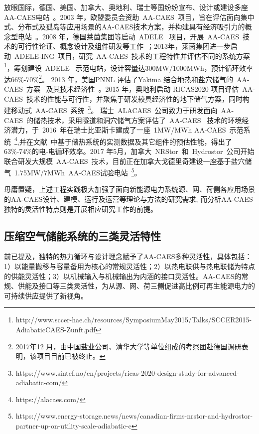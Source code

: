 放眼国际，德国、美国、加拿大、奥地利、瑞士等国纷纷宣布、设计或建设多座AA-CAES电站~\cite{CAES-Review-16-Polygeneration,CAES-Review-09,CAES-Review-16-Rui}。2003 年，欧盟委员会资助~AA-CAES~项目，旨在评估面向集中式、分布式及孤岛等应用场景的AA-CAES技术方案，并构建具有经济吸引力的概念型电站~\cite{AA-CAES-04}。2008 年，德国莱茵集团等启动~ADELE~ 项目，开展~AA-CAES~技术的可行性论证、概念设计及组件研发等工作~\cite{AA-CAES-07}；2013年，莱茵集团进一步启动~ADELE-ING~项目，研究~AA-CAES~技术的工程特性并评估不同的系统方案\footnote{http://www.sccer-hae.ch/resources/SymposiumMay2015/Talks/SCCER2015-AdiabaticCAES-Zunft.pdf}，筹划建设~ADELE~ 示范电站，设计容量达300MW/1000MWh，预计循环效率达66\%-70\%\footnote{2017年12 月，由中国盐业公司、清华大学等单位组成的考察团赴德国调研表明，该项目目前已被终止。}。 2013 年，美国PNNL 评估了Yakima 结合地热和盐穴储气的~AA-CAES~方案~\cite{AA-CAES-Patent-12} 及其技术经济性~\cite{CAES-PNNL-13}。2015 年，奥地利启动 RICAS2020 项目评估~AA-CAES~技术的性能与可行性，并聚焦于研发较具经济性的地下储气方案，同时构建移动式~AA-CAES~系统~\footnote{https://www.sintef.no/en/projects/ricas-2020-design-study-for-advanced-adiabatic-com/}。 瑞士~ALACAES~公司致力于研发面向~AA-CAES~的储热技术，采用隧道和洞穴储气方案评估了~AA-CAES~ 技术的环境经济潜力，于~2016~年在瑞士比亚斯卡建成了一座~1MW/MWh AA-CAES~示范系统~\footnote{https://alacaes.com/},并在文献~中基于储热系统的实测数据及其它组件的预估性能，得出了63\%-74\%的电-电循环效率。2017 年5月，加拿大~NRStor~和~Hydrostor~公司开始联合研发大规模~AA-CAES~技术，目前正在加拿大戈德里奇建设一座基于盐穴储气~1.75MW/7MWh~AA-CAES试验电站~\footnote{https://www.energy-storage.news/news/canadian-firms-nrstor-and-hydrostor-partner-up-on-utility-scale-adiabatic-c}。

毋庸置疑，上述工程实践极大加强了面向新能源电力系统源、网、荷侧各应用场景的AA-CAES设计、建模、运行及运营等理论与方法的研究需求, 而分析AA-CAES独特的灵活性特点则是开展相应研究工作的前提。


\subsection{压缩空气储能系统的三类灵活特性}
\label{sec:flexibility-intro}
前已提及，独特的热力循环与设计理念赋予了AA-CAES多种灵活性，具体包括：1）以能量搬移与容量备用为核心的常规灵活性；2）以热电联供与热电联储为特点的供能灵活性；3）以机械输入与机械输出为内涵的接口灵活性。AA-CAES的常规、供能及接口等三类灵活性，为从源、网、荷三侧促进高比例可再生能源电力的可持续供应提供了新视角。

